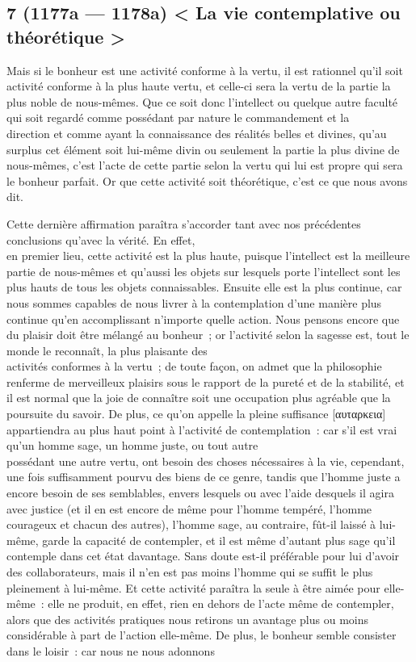 \documentclass[french,twoside]{book} %
\begin{document}
\subsection[{7 (1177a — 1178a) < La vie contemplative ou théorétique >}]{7 (1177a — 1178a) < La vie contemplative ou théorétique >}
\noindent Mais si le bonheur est une activité conforme à la vertu, il est rationnel qu’il soit activité conforme à la plus haute vertu, et celle-ci sera la vertu de la partie la plus noble de nous-mêmes. Que ce soit donc l’intellect ou quelque autre faculté qui soit regardé comme possédant par nature le commandement et la \\
direction et comme ayant la connaissance des réalités belles et divines, qu’au surplus cet élément soit lui-même divin ou seulement la partie la plus divine de nous-mêmes, c’est l’acte de cette partie selon la vertu qui lui est propre qui sera le bonheur parfait. Or que cette activité soit théorétique, c’est ce que nous avons dit.\par
Cette dernière affirmation paraîtra s’accorder tant avec nos précédentes conclusions qu’avec la vérité. En effet, \\
en premier lieu, cette activité est la plus haute, puisque l’intellect est la meilleure partie de nous-mêmes et qu’aussi les objets sur lesquels porte l’intellect sont les plus hauts de tous les objets connaissables. Ensuite elle est la plus continue, car nous sommes capables de nous livrer à la contemplation d’une manière plus continue qu’en accomplissant n’importe quelle action. Nous pensons encore que du plaisir doit être mélangé au bonheur ; or l’activité selon la sagesse est, tout le monde le reconnaît, la plus plaisante des \\
activités conformes à la vertu ; de toute façon, on admet que la philosophie renferme de merveilleux plaisirs sous le rapport de la pureté et de la stabilité, et il est normal que la joie de connaître soit une occupation plus agréable que la poursuite du savoir. De plus, ce qu’on appelle la pleine suffisance [αυταρκεια] appartiendra au plus haut point à l’activité de contemplation : car s’il est vrai qu’un homme sage, un homme juste, ou tout autre \\
possédant une autre vertu, ont besoin des choses nécessaires à la vie, cependant, une fois suffisamment pourvu des biens de ce genre, tandis que l’homme juste a encore besoin de ses semblables, envers lesquels ou avec l’aide desquels il agira avec justice (et il en est encore de même pour l’homme tempéré, l’homme courageux et chacun des autres), l’homme sage, au contraire, fût-il laissé à lui-même, garde la capacité de contempler, et il est même d’autant plus sage qu’il contemple dans cet état davantage. Sans doute est-il préférable pour lui d’avoir des collaborateurs, mais il n’en est pas moins l’homme qui se  suffit le plus pleinement à lui-même. Et cette activité paraîtra la seule à être aimée pour elle-même : elle ne produit, en effet, rien en dehors de l’acte même de contempler, alors que des activités pratiques nous retirons un avantage plus ou moins considérable à part de l’action elle-même. De plus, le bonheur semble consister dans le loisir : car nous ne nous adonnons \\
\end{document}
